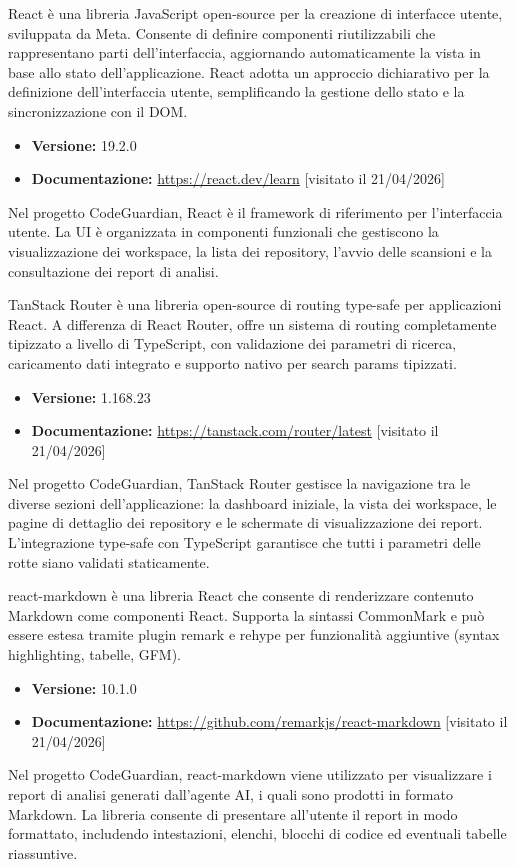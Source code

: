 \documentclass[a4paper, 11pt]{article}
\newcounter{subsubsubsection}[subsubsection]
\begin{document}
React è una libreria JavaScript open-source per la creazione di interfacce utente, sviluppata da Meta. Consente di definire componenti riutilizzabili che rappresentano parti dell'interfaccia, aggiornando automaticamente la vista in base allo stato dell'applicazione. React adotta un approccio dichiarativo per la definizione dell'interfaccia utente, semplificando la gestione dello stato e la sincronizzazione con il DOM\@.
\begin{itemize}
  \item \textbf{Versione:} 19.2.0
  \item \textbf{Documentazione:} \url{https://react.dev/learn} [visitato il 21/04/2026]
\end{itemize}
Nel progetto CodeGuardian, React è il framework di riferimento per l'interfaccia utente. La UI è organizzata in componenti funzionali che gestiscono la visualizzazione dei workspace, la lista dei repository, l'avvio delle scansioni e la consultazione dei report di analisi.

TanStack Router è una libreria open-source di routing type-safe per applicazioni React. A differenza di React Router, offre un sistema di routing completamente tipizzato a livello di TypeScript, con validazione dei parametri di ricerca, caricamento dati integrato e supporto nativo per search params tipizzati.
\begin{itemize}
  \item \textbf{Versione:} 1.168.23
  \item \textbf{Documentazione:} \url{https://tanstack.com/router/latest} [visitato il 21/04/2026]
\end{itemize}
Nel progetto CodeGuardian, TanStack Router gestisce la navigazione tra le diverse sezioni dell'applicazione: la dashboard iniziale, la vista dei workspace, le pagine di dettaglio dei repository e le schermate di visualizzazione dei report. L'integrazione type-safe con TypeScript garantisce che tutti i parametri delle rotte siano validati staticamente.

react-markdown è una libreria React che consente di renderizzare contenuto Markdown come componenti React. Supporta la sintassi CommonMark e può essere estesa tramite plugin remark e rehype per funzionalità aggiuntive (syntax highlighting, tabelle, GFM).
\begin{itemize}
  \item \textbf{Versione:} 10.1.0
  \item \textbf{Documentazione:} \url{https://github.com/remarkjs/react-markdown} [visitato il 21/04/2026]
\end{itemize}
Nel progetto CodeGuardian, react-markdown viene utilizzato per visualizzare i report di analisi generati dall'agente AI, i quali sono prodotti in formato Markdown. La libreria consente di presentare all'utente il report in modo formattato, includendo intestazioni, elenchi, blocchi di codice ed eventuali tabelle riassuntive.
\end{document}
